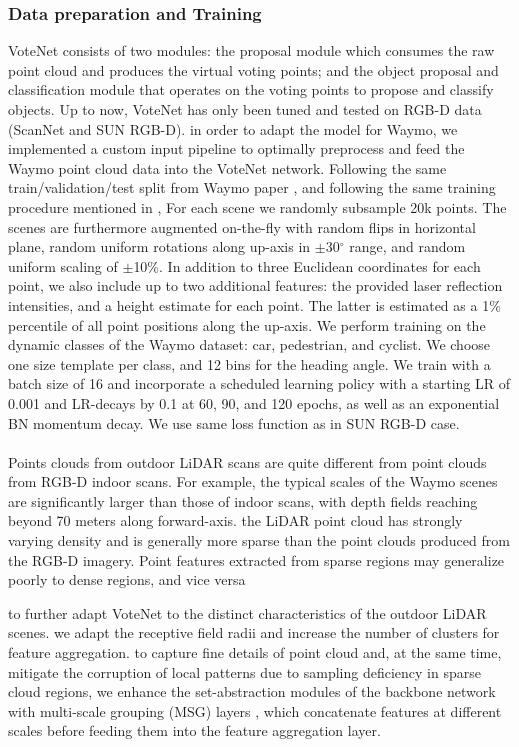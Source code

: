 \documentclass[10pt,twocolumn,letterpaper]{article}
\begin{document}
\subsubsection {Data preparation and Training}
VoteNet consists of two modules: the proposal module which consumes the raw point cloud and produces the virtual voting points; and the object proposal and classification module that operates on the voting points to propose and classify objects. Up to now, VoteNet has only been tuned and tested on RGB-D data (ScanNet and SUN RGB-D). in order to adapt the model for Waymo, we implemented a custom input pipeline to optimally preprocess and feed the Waymo point cloud data into the VoteNet network.
Following the same train/validation/test split from Waymo paper \cite{cite waymo}, and following the same training procedure mentioned in \cite{votenet}, For each scene we randomly subsample 20k points. The scenes are furthermore augmented on-the-fly with random flips in horizontal plane, random uniform rotations along up-axis in  $\pm$30$^{\circ}$ range, and random uniform scaling of $\pm$10\%. In addition to three Euclidean coordinates for each point, we also include up to two additional features: the provided laser reflection intensities, and a height estimate for each point. The latter is estimated as a 1\% percentile of all point positions along the up-axis.
We perform training on the dynamic classes of the Waymo dataset: car, pedestrian, and cyclist. We choose one size template per class, and 12 bins for the heading angle. We train with a batch size of 16 and incorporate a scheduled learning policy with a starting LR of 0.001 and LR-decays by 0.1 at 60, 90, and 120 epochs, as well as an exponential BN momentum decay. We use same loss function as in SUN RGB-D case.
\paragraph{}
Points clouds from outdoor LiDAR scans are quite different from point clouds from RGB-D indoor scans. For example, the typical scales of the Waymo scenes are significantly larger than those of indoor scans, with depth fields reaching beyond 70 meters along forward-axis. the LiDAR point cloud has strongly varying density and is generally more sparse than the point clouds produced from the RGB-D imagery. Point features extracted from sparse regions may generalize poorly to dense regions, and vice versa

to further adapt VoteNet to the distinct characteristics of the outdoor LiDAR scenes. we adapt the receptive field radii and increase the number of clusters for feature aggregation. to capture fine details of point cloud and, at the same time, mitigate  the corruption of local patterns due to sampling deficiency in sparse cloud regions, we enhance the set-abstraction modules of the backbone network with multi-scale grouping (MSG) layers \cite{pointnet++}, which concatenate features at different scales before feeding them into the feature aggregation layer.
\end{document}

